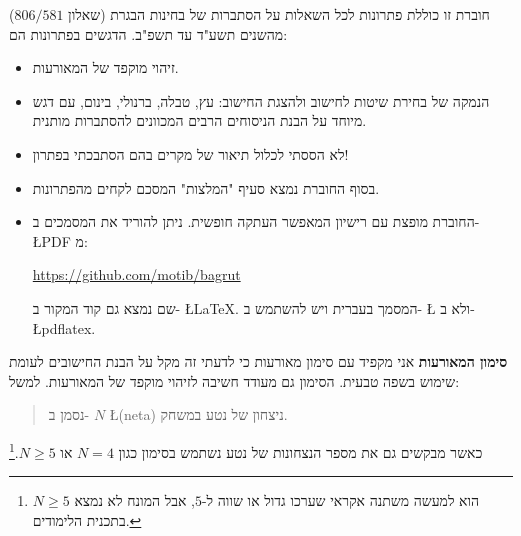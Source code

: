 חוברת זו כוללת פתרונות לכל השאלות על הסתברות של בחינות הבגרת (שאלון 
$806 / 581$)
מהשנים תשע"ד עד תשפ"ב. 
הדגשים בפתרונות הם:
\begin{itemize}
\item 
זיהוי מוקפד של המאורעות.

\item
הנמקה של בחירת שיטות לחישוב ולהצגת החישוב: עץ, טבלה, ברנולי, בינום, עם דגש מיוחד על הבנת הניסוחים הרבים המכוונים להסתברות מותנית.
\item
לא הססתי לכלול תיאור של מקרים בהם הסתבכתי בפתרון!
\item
בסוף החוברת נמצא סעיף "המלצות" המסכם לקחים מהפתרונות.
\item
החוברת מופצת עם רישיון המאפשר העתקה חופשית. ניתן להוריד את המסמכים ב-%
\L{PDF}
מ:
\begin{center}
\url{https://github.com/motib/bagrut}
\end{center}
שם נמצא גם קוד המקור ב-%
\L{\LaTeX{}}.
המסמך בעברית ויש להשתמש ב-%
\L{\XeLaTeX{}}
ולא ב-%
\L{pdflatex}.
\end{itemize}

\textbf{סימון המאורעות}
אני מקפיד עם סימון מאורעות כי לדעתי זה מקל על הבנת החישובים לעומת שימוש בשפה טבעית. הסימון גם מעודד חשיבה לזיהוי מוקפד של המאורעות. למשל:
\begin{quote}
נסמן ב-%
$N$ \L{(neta)}
ניצחון של נטע במשחק.
\end{quote}
כאשר מבקשים גם את מספר הנצחונות של נטע נשתמש בסימון כגון
$N=4$
או
$N\geq 5$.\footnote{$N\geq 5$
הוא למעשה משתנה אקראי שערכו גדול או שווה ל-$5$, אבל המונח לא נמצא בתכנית הלימודים.}

